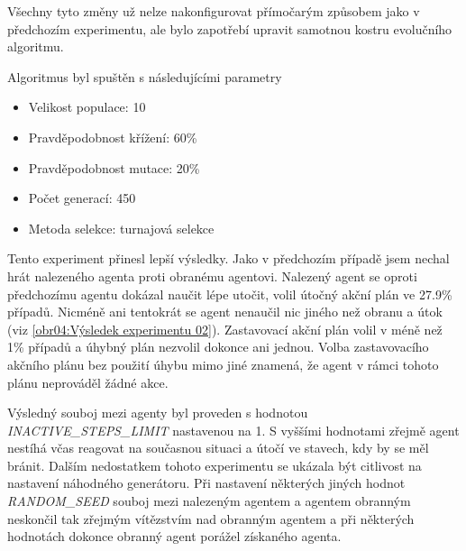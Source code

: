 \par
Všechny tyto změny už nelze nakonfigurovat přímočarým způsobem jako v předchozím experimentu, ale bylo zapotřebí upravit samotnou kostru evolučního algoritmu.
\par
Algoritmus byl spuštěn s následujícími parametry
\begin{itemize}
    \item Velikost populace: 10
    \item Pravděpodobnost křížení: 60\%
    \item Pravděpodobnost mutace: 20\%
    \item Počet generací: 450
    \item Metoda selekce: turnajová selekce
\end{itemize}

Tento experiment přinesl lepší výsledky. Jako v předchozím případě jsem nechal hrát nalezeného agenta proti obranému agentovi.
Nalezený agent se oproti předchozímu agentu dokázal naučit lépe utočit, volil útočný akční plán ve 27.9\% případů. 
Nicméně ani tentokrát se agent nenaučil nic jiného než obranu a útok (viz \ref{obr04:Výsledek experimentu 02}). 
Zastavovací akční plán volil v méně než 1\% případů a úhybný plán nezvolil dokonce ani jednou. Volba zastavovacího akčního plánu bez použití úhybu mimo jiné znamená, že agent v rámci tohoto plánu neprováděl žádné akce.
\par
Výsledný souboj mezi agenty byl proveden s hodnotou \emph{\uppercase{inactive\_steps\_limit}} nastavenou na 1.
S vyššími hodnotami zřejmě agent nestíhá včas reagovat na současnou situaci a útočí ve stavech, kdy by se měl bránit.
Dalším nedostatkem tohoto experimentu se ukázala být citlivost na nastavení náhodného generátoru. Při nastavení některých jiných hodnot \emph{\uppercase{random\_seed}} souboj mezi nalezeným agentem a agentem obranným neskončil tak zřejmým vítězstvím nad obranným agentem a při některých hodnotách dokonce obranný agent porážel získaného agenta.

 


